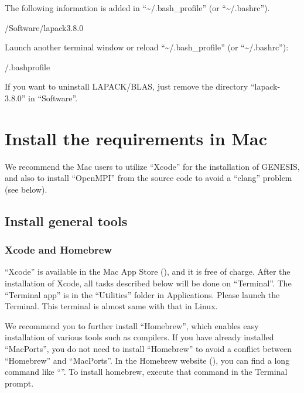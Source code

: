 \documentclass[a4paper,11pt,oneside,english]{sphinxmanual}
\begin{document}
The following information is added in “\textasciitilde{}/.bash\_profile” (or “\textasciitilde{}/.bashrc”).

\begin{sphinxVerbatim}[commandchars=\\\{\}]
 /Software/lapack\PYGZhy{}3.8.0
\end{sphinxVerbatim}

Launch another terminal window or reload “\textasciitilde{}/.bash\_profile” (or “\textasciitilde{}/.bashrc”):

\begin{sphinxVerbatim}[commandchars=\\\{\}]
\PYGZdl{}  \PYGZti{}/.bash\PYGZus{}profile
\end{sphinxVerbatim}

If you want to uninstall LAPACK/BLAS, just remove the directory “lapack-3.8.0” in “Software”.

\clearpage


\section{Install the requirements in Mac}
\label{\detokenize{98_Appendix:install-the-requirements-in-mac}}
We recommend the Mac users to utilize “Xcode” for the installation of GENESIS,
and also to install “OpenMPI” from the source code to avoid a “clang” problem (see below).


\subsection{Install general tools}
\label{\detokenize{98_Appendix:install-general-tools}}

\subsubsection{Xcode and Homebrew}
\label{\detokenize{98_Appendix:xcode-and-homebrew}}
“Xcode” is available in the Mac App Store (),
and it is free of charge.
After the installation of Xcode, all tasks described below will be done on “Terminal”.
The “Terminal app” is in the “Utilities” folder in Applications.
Please launch the Terminal. This terminal is almost same with that in Linux.

We recommend you to further install “Homebrew”, which enables easy installation
of various tools such as compilers. If you have already installed “MacPorts”,
you do not need to install “Homebrew” to avoid a conflict between “Homebrew” and “MacPorts”.
In the Homebrew website (), you can find a long command
like “”.
To install homebrew, execute that command in the Terminal prompt.
\end{document}
